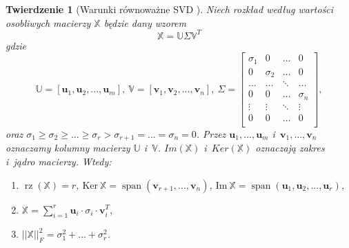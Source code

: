 \documentclass[12pt,a4paper]{report}
\newtheorem{tw}[df]{Twierdzenie}
\newcommand{\przestrzen}[1]{\operatorname{span}\left({#1} \right)}
\newcommand{\rz}[1]{\operatorname{rz}\left({#1} \right)}
\begin{document}
\begin{tw}[Warunki równoważne SVD {\citep{ulafiir}}]%
Niech rozkład według wartości osobliwych macierzy $\mathbb{X}$ będzie dany wzorem
$$
\mathbb{X}=\mathbb{U} \Sigma \mathbb{V}^T
$$
gdzie 
$$\mathbb{U}=[\mathbf{u}_1,\mathbf{u}_2,...,\mathbf{u}_m], \: \mathbb{V} = [\mathbf{v}_1,\mathbf{v}_2,...,\mathbf{v}_n], \: \Sigma = \left[
        \begin{array}{cccc}
         \sigma_{1} & 0 & \ldots & 0 \\
         0 & \sigma_{2} & \ldots & 0 \\
         \ldots & \ldots& \ddots & \ldots \\
         0 & 0 & \ldots & \sigma_{n} \\
         \vdots & \vdots & \ddots & \vdots \\
         0 & 0 & \ldots & 0 \\
         \end{array}
      \right],$$
oraz 
$\sigma_{1}\geq \sigma_{2} \geq ... \geq \sigma_{r} > \sigma_{r+1} = ... = \sigma_{n} = 0$. Przez $\mathbf{u}_1, \ldots, \mathbf{u}_m$ i~$\mathbf{v}_1, \ldots, \mathbf{v}_n$ oznaczamy kolumny macierzy $\mathbb{U}$ i~$\mathbb{V}$.
$Im(\mathbb{X})$ i~$Ker(\mathbb{X})$ oznaczają zakres i~jądro macierzy.
Wtedy:
\begin{enumerate}
\item $\rz{\mathbb{X}} = r$, $\mathrm{Ker} \: \mathbb{X} = \przestrzen{\mathbf{v}_{r+1},...,\mathbf{v}_n}$, 
$\mathrm{Im} \: \mathbb{X} = \przestrzen{\mathbf{u}_1,\mathbf{u}_2,...,\mathbf{u}_r}$,
\item $\mathbb{X} = \sum_{i=1}^r \mathbf{u}_i \cdot\sigma_i \cdot \mathbf{v}_i^T,$
\item $||\mathbb{X}||_F^2 = \sigma_{1}^2+...+\sigma_{r}^2$.
\end{enumerate}
\end{tw}
\end{document}
